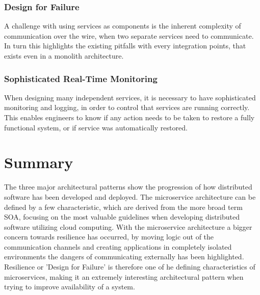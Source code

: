 \subsubsection*{Design for Failure}
A challenge with using services as components is the inherent complexity of communication over the wire, when two separate services need to communicate. In turn this highlights the existing pitfalls with every integration points, that exists even in a monolith architecture.

\subsubsection*{Sophisticated Real-Time Monitoring}
When designing many independent services, it is necessary to have sophisticated monitoring and logging, in order to control that services are running correctly. This enables engineers to know if any action needs to be taken to restore a fully functional system, or if service was automatically restored.

\section{Summary}
The three major architectural patterns show the progression of how distributed software has been developed and deployed. The microservice architecture can be defined by a few characteristic, which are derived from the more broad term SOA, focusing on the most valuable guidelines when developing distributed software utilizing cloud computing. With the microservice architecture a bigger concern towards resilience has occurred, by moving logic out of the communication channels and creating applications in completely isolated environments the dangers of communicating externally has been highlighted. Resilience or 'Design for Failure' is therefore one of he defining characteristics of microservices, making it an extremely interesting architectural pattern when trying to improve availability of a system.